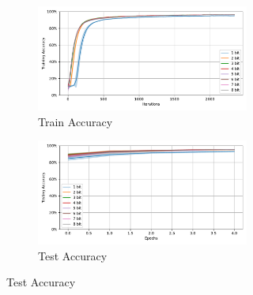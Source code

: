     \label{appendix:accuracy_curves_nmnist}
        \begin{figure}[H]
            \centering
            \begin{subfigure}[H]{0.55\textwidth}
                \centering
                \begin{subfigure}[H]{\textwidth}
                    \centering
                    \includegraphics[width=\textwidth]{../standard/NMNIST/plots/nmnist_train_acc.pdf}
                    \caption{Train Accuracy}
                \end{subfigure}
                \hfill
                \begin{subfigure}[H]{\textwidth}
                    \centering
                    \includegraphics[width=\textwidth]{../standard/NMNIST/plots/nmnist_test_acc.pdf}
                    \caption{Test Accuracy}
                \end{subfigure}
            \end{subfigure}
            \hfill
            \begin{subfigure}[H]{0.3\textwidth}
                \centering

\end{subfigure}
\end{figure}
